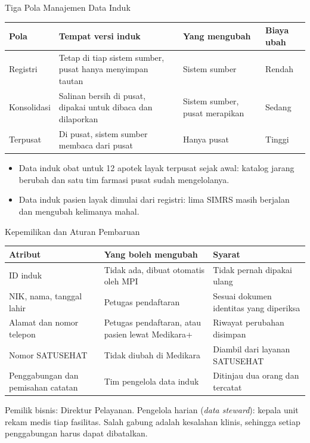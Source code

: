 \documentclass[aspectratio=169, table, 12pt]{beamer}
\begin{document}
\begin{frame}{{\Large Tiga Pola Manajemen Data Induk}}
  \footnotesize
  \begin{tabularx}{\textwidth}{L{1.8cm}YYL{1.5cm}}
    \hline
    \textbf{Pola} & \textbf{Tempat versi induk} & \textbf{Yang mengubah} & \textbf{Biaya ubah} \\
    \hline
    Registri & Tetap di tiap sistem sumber, pusat hanya menyimpan tautan & Sistem sumber & Rendah \\
    \hline
    Konsolidasi & Salinan bersih di pusat, dipakai untuk dibaca dan dilaporkan & Sistem sumber, pusat merapikan & Sedang \\
    \hline
    Terpusat & Di pusat, sistem sumber membaca dari pusat & Hanya pusat & Tinggi \\
    \hline
  \end{tabularx}

  \vspace{4pt}
  \small
  \begin{itemize}
    \item Data induk obat untuk 12 apotek layak terpusat sejak awal: katalog jarang berubah dan satu
          tim farmasi pusat sudah mengelolanya.
    \item Data induk pasien layak dimulai dari registri: lima SIMRS masih berjalan dan mengubah
          kelimanya mahal.
  \end{itemize}
\end{frame}

\begin{frame}{{\Large Kepemilikan dan Aturan Pembaruan}}
  \footnotesize
  \begin{tabularx}{\textwidth}{L{3.7cm}YY}
    \hline
    \textbf{Atribut} & \textbf{Yang boleh mengubah} & \textbf{Syarat} \\
    \hline
    ID induk & Tidak ada, dibuat otomatis oleh MPI & Tidak pernah dipakai ulang \\
    \hline
    NIK, nama, tanggal lahir & Petugas pendaftaran & Sesuai dokumen identitas yang diperiksa \\
    \hline
    Alamat dan nomor telepon & Petugas pendaftaran, atau pasien lewat Medikara+ & Riwayat perubahan disimpan \\
    \hline
    Nomor SATUSEHAT & Tidak diubah di Medikara & Diambil dari layanan SATUSEHAT \\
    \hline
    Penggabungan dan pemisahan catatan & Tim pengelola data induk & Ditinjau dua orang dan tercatat \\
    \hline
  \end{tabularx}

  \vspace{4pt}
  \small Pemilik bisnis: Direktur Pelayanan. Pengelola harian (\textit{data steward}): kepala
  unit rekam medis tiap fasilitas. Salah gabung adalah kesalahan klinis, sehingga setiap
  penggabungan harus dapat dibatalkan.
\end{frame}
\end{document}
